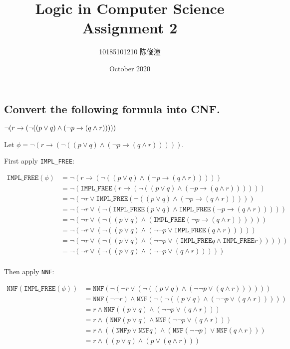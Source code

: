 \documentclass{ctexart}
\title{Logic in Computer Science Assignment 2}
\author{10185101210 陈俊潼}
\date{October 2020}
\def\n{\neg}
\def\d{\vee}
\def\c{\wedge}
\def\NNF{\texttt{NNF}}
\def\IMPLFREE{\texttt{IMPL\_FREE}}
\begin{document}
\maketitle

\section{}

\subsection{Convert the following formula into CNF.}

$\neg(r \rightarrow(\neg((p \vee q) \wedge(\neg p \rightarrow(q \wedge r)))))\\$

Let $\phi = \neg(r \rightarrow(\neg((p \vee q) \wedge(\neg p \rightarrow(q \wedge r)))))$.

First apply \IMPLFREE:

$$
\begin{aligned}
    \IMPLFREE(\phi) &= \n(r\to (\n((p\d q) \c (\n p \to (q \c r))))) \\
    &= \n(\IMPLFREE(r \to (\n ((p \d q) \c  (\n p \to (q \c r)))))) \\
    &= \n(\n r \d \IMPLFREE (\n((p \d q) \c (\n p \to (q \c r))))) \\
    &= \n(\n r \d (\n(\IMPLFREE (p \d q) \c \IMPLFREE (\n p \to (q \c r))))) \\
    &= \n(\n r \d (\n((p \d q) \c (\IMPLFREE (\n p \to (q \c r)))))) \\
    &= \n(\n r \d (\n((p \d q) \c (\n \n p \d \IMPLFREE(q \c r))))) \\
    &= \n(\n r \d (\n((p \d q) \c (\n \n p \d (\IMPLFREE q \c \IMPLFREE r))))) \\
    &= \n(\n r \d (\n((p \d q) \c (\n \n p \d(q \c r))))) \\
\end{aligned}
$$

Then apply \NNF:

$$
\begin{aligned}
    \NNF(\IMPLFREE(\phi)) &= \NNF(\n(\n r \d (\n((p \d q) \c (\n \n p \d(q \c r)))))) \\
    &= \NNF(\n \n r) \c \NNF (\n (\n ((p \d q) \c (\n \n p \d (q \c r))))) \\
    &= r \c \NNF ((p \d q) \c (\n \n p \d (q \c r))) \\
    &= r \c (\NNF(p \d q) \c \NNF (\n \n p \d (q \c r))) \\
    &= r \c ((\NNF p \d \NNF q) \c (\NNF (\n \n p) \d \NNF (q \c r)))\\
    &= r \c ((p \d q) \c (p \d (q \c r)))
\end{aligned}
$$
\end{document}
